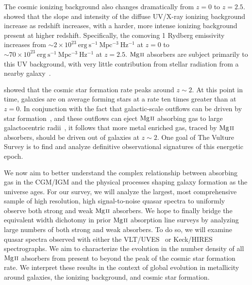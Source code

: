 \documentclass[iop,apj,numberedappendix,appendixfloats,twocolappendix]{emulateapj}
\begin{document}


The cosmic ionizing background also changes dramatically from $z = 0$ to $z = 2.5$. \cite{Haardt2012} showed that the slope and intensity of the diffuse UV/X-ray ionizing background increase as redshift increases, with a harder, more intense ionizing background present at higher redshift. Specifically, the comoving 1 Rydberg emissivity increases from $\sim2 \times 10^{23}~\mathrm{erg~s^{-1}~Mpc^{-3}~Hz^{-1}}$ at $z = 0$ to $\sim70 \times 10^{23}~\mathrm{erg~s^{-1}~Mpc^{-3}~Hz^{-1}}$ at $z = 2.5$. ${\hbox{{\rm Mg}\kern 0.1em{\sc ii}}}$ absorbers are subject primarily to this UV background, with very little contribution from stellar radiation from a nearby galaxy~\citep{Churchill1999,Charlton2000,Rigby2002}.

\cite{Behroozi2013sfr} showed that the cosmic star formation rate peaks around $z \sim 2$. At this point in time, galaxies are on average forming stars at a rate ten times greater than at $z = 0$. In conjunction with the fact that galactic-scale outflows can be driven by star formation~\citep{Zhu2015}, and these outflows can eject ${\hbox{{\rm Mg}\kern 0.1em{\sc ii}}}$ absorbing gas to large galactocentric radii~\citep{Sharma2013,Kacprzak2012-PA,Nestor2011}, it follows that more metal enriched gas, traced by ${\hbox{{\rm Mg}\kern 0.1em{\sc ii}}}$ absorbers, should be driven out of galaxies at $z \sim 2$. One goal of The Vulture Survey is to find and analyze definitive observational signatures of this energetic epoch. 

We now aim to better understand the complex relationship between absorbing gas in the CGM/IGM and the physical processes shaping galaxy formation as the universe ages. For our survey, we will analyze the largest, most comprehensive sample of high resolution, high signal-to-noise quasar spectra to uniformly observe both strong and weak ${\hbox{{\rm Mg}\kern 0.1em{\sc ii}}}$ absorbers. We hope to finally bridge the equivalent width dichotomy in prior ${\hbox{{\rm Mg}\kern 0.1em{\sc ii}}}$ absorption line surveys by analyzing large numbers of both strong and weak absorbers. To do so, we will examine quasar spectra observed with either the VLT/UVES~\citep{Dekker2000} or Keck/HIRES~\citep{Vogt1994} spectrographs. We aim to characterize the evolution in the number density of all ${\hbox{{\rm Mg}\kern 0.1em{\sc ii}}}$ absorbers from present to beyond the peak of the cosmic star formation rate. We interpret these results in the context of global evolution in metallicity around galaxies, the ionizing background, and cosmic star formation.
\end{document}
